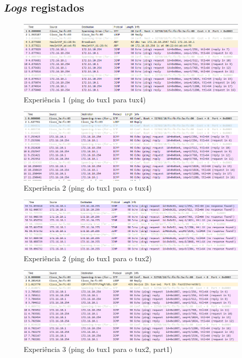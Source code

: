 \documentclass{article}
\begin{document}
\subsection{\textit{Logs} registados}
\begin{figure}[H]
    \centering
    \includegraphics[scale=0.5]{images/exp1.PNG}
    \caption{Experiência 1 (ping do tux1 para tux4)}
\end{figure}
\begin{figure}[H]
    \centering
    \includegraphics[scale=0.5]{images/exp2_1_4.PNG}
    \caption{Experiência 2 (ping do tux1 para o tux4)}
\end{figure}
\begin{figure}[H]
    \centering
    \includegraphics[scale=0.5]{images/exp2_1_2.PNG}
    \caption{Experiência 2 (ping do tux1 para o tux2)}
\end{figure}
\begin{figure}[H]
    \centering
    \includegraphics[scale=0.5]{images/exp3_part1.PNG}
    \caption{Experiência 3 (ping do tux1 para o tux2, part1)}
\end{figure}
\end{document}

